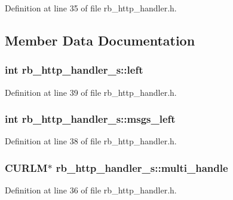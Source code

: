Definition at line 35 of file rb\+\_\+http\+\_\+handler.\+h.



\subsection{Member Data Documentation}
\hypertarget{structrb__http__handler__s_a6239490836609d286669af640028ae71}{}
\subsubsection[{left}]{\setlength{\rightskip}{0pt plus 5cm}int rb\+\_\+http\+\_\+handler\+\_\+s\+::left}\label{structrb__http__handler__s_a6239490836609d286669af640028ae71}


Definition at line 39 of file rb\+\_\+http\+\_\+handler.\+h.

\hypertarget{structrb__http__handler__s_a803db851c00a617f8a80f00f29d9dba3}{}
\subsubsection[{msgs\+\_\+left}]{\setlength{\rightskip}{0pt plus 5cm}int rb\+\_\+http\+\_\+handler\+\_\+s\+::msgs\+\_\+left}\label{structrb__http__handler__s_a803db851c00a617f8a80f00f29d9dba3}


Definition at line 38 of file rb\+\_\+http\+\_\+handler.\+h.

\hypertarget{structrb__http__handler__s_a45c0ce1f2e4d154d0194bb60569c0faf}{}
\subsubsection[{multi\+\_\+handle}]{\setlength{\rightskip}{0pt plus 5cm}C\+U\+R\+L\+M$\ast$ rb\+\_\+http\+\_\+handler\+\_\+s\+::multi\+\_\+handle}\label{structrb__http__handler__s_a45c0ce1f2e4d154d0194bb60569c0faf}


Definition at line 36 of file rb\+\_\+http\+\_\+handler.\+h.

